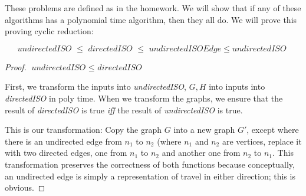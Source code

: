 \documentclass[12pt]{article}
\begin{document}
These problems are defined as in the homework. We will show that if any of these algorithms has a polynomial time algorithm, then they all do. We will prove this proving cyclic reduction: 

\[ \textit{undirectedISO } \leq \textit{ directedISO } \leq \textit{ undirectedISOEdge} \leq \textit{undirectedISO } \]

\begin{proof}{$\textit{undirectedISO } \leq \textit{ directedISO }$}

First, we transform the inputs into \textit{undirectedISO}, $G, H$ into inputs into \textit{directedISO} in poly time. When we transform the graphs, we ensure that the result of \textit{directedISO} is true \textit{iff} the result of \textit{undirectedISO} is true.

This is our transformation: Copy the graph $G$ into a new graph $G'$, except where there is an undirected edge from $n_{1}$ to $n_{2}$ (where $n_{1}$ and $n_{2}$ are vertices, replace it with two directed edges, one from $n_{1}$ to $n_{2}$ and another one from $n_{2}$ to $n_{1}$. This transformation preserves the correctness of both functions because conceptually, an undirected edge is simply a representation of travel in either direction; this is obvious.
\end{proof}
\end{document}
